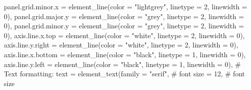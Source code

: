 \documentclass[
  letterpaper,
  DIV=11,
  numbers=noendperiod]{scrartcl}
\newenvironment{Shaded}{\begin{snugshade}}{\end{snugshade}}
\newcommand{\AttributeTok}[1]{\textcolor[rgb]{0.40,0.45,0.13}{#1}}
\newcommand{\CommentTok}[1]{\textcolor[rgb]{0.37,0.37,0.37}{#1}}
\newcommand{\DecValTok}[1]{\textcolor[rgb]{0.68,0.00,0.00}{#1}}
\newcommand{\FunctionTok}[1]{\textcolor[rgb]{0.28,0.35,0.67}{#1}}
\newcommand{\NormalTok}[1]{\textcolor[rgb]{0.00,0.23,0.31}{#1}}
\newcommand{\StringTok}[1]{\textcolor[rgb]{0.13,0.47,0.30}{#1}}
\begin{document}
\begin{Shaded}
\begin{Highlighting}[]
        \AttributeTok{panel.grid.minor.x =} \FunctionTok{element\_line}\NormalTok{(}\AttributeTok{color =} \StringTok{"lightgrey"}\NormalTok{,}
                                          \AttributeTok{linetype =} \DecValTok{2}\NormalTok{,}
                                          \AttributeTok{linewidth =} \DecValTok{0}\NormalTok{),}
        \AttributeTok{panel.grid.major.y =} \FunctionTok{element\_line}\NormalTok{(}\AttributeTok{color =} \StringTok{"grey"}\NormalTok{,}
                                          \AttributeTok{linetype =} \DecValTok{2}\NormalTok{,}
                                          \AttributeTok{linewidth =} \DecValTok{0}\NormalTok{),}
        \AttributeTok{panel.grid.minor.y =} \FunctionTok{element\_line}\NormalTok{(}\AttributeTok{color =} \StringTok{"grey"}\NormalTok{,}
                                          \AttributeTok{linetype =} \DecValTok{2}\NormalTok{,}
                                          \AttributeTok{linewidth =} \DecValTok{0}\NormalTok{),}
        \AttributeTok{axis.line.x.top =} \FunctionTok{element\_line}\NormalTok{(}\AttributeTok{color =} \StringTok{"white"}\NormalTok{,}
                                       \AttributeTok{linetype =} \DecValTok{2}\NormalTok{,}
                                       \AttributeTok{linewidth =} \DecValTok{0}\NormalTok{),}
        \AttributeTok{axis.line.y.right =} \FunctionTok{element\_line}\NormalTok{(}\AttributeTok{color =} \StringTok{"white"}\NormalTok{,}
                                         \AttributeTok{linetype =} \DecValTok{2}\NormalTok{,}
                                         \AttributeTok{linewidth =} \DecValTok{0}\NormalTok{),}
        \AttributeTok{axis.line.x.bottom =} \FunctionTok{element\_line}\NormalTok{(}\AttributeTok{color =} \StringTok{"black"}\NormalTok{,}
                                          \AttributeTok{linetype =} \DecValTok{1}\NormalTok{,}
                                          \AttributeTok{linewidth =} \DecValTok{0}\NormalTok{),}
        \AttributeTok{axis.line.y.left =} \FunctionTok{element\_line}\NormalTok{(}\AttributeTok{color =} \StringTok{"black"}\NormalTok{,}
                                        \AttributeTok{linetype =} \DecValTok{1}\NormalTok{,}
                                        \AttributeTok{linewidth =} \DecValTok{0}\NormalTok{),}
        \CommentTok{\# Text formatting:}
        \AttributeTok{text =} \FunctionTok{element\_text}\NormalTok{(}\AttributeTok{family =} \StringTok{"serif"}\NormalTok{, }\CommentTok{\# font}
                            \AttributeTok{size =} \DecValTok{12}\NormalTok{, }\CommentTok{\# font size}

\end{Highlighting}
\end{Shaded}
\end{document}
